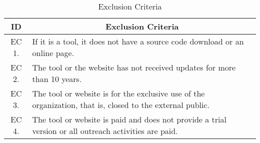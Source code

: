 \begin{table}[!htb]
  \centering
  \caption{Exclusion Criteria}
  \label{tbl:gl-exclusion-criteria}
  \footnotesize
  \begin{tabular}{c|p{12cm}}
    \bottomrule
    \rowcolor[rgb]{0.753,0.753,0.753} \textbf{ID} & \multicolumn{1}{c}{\textbf{Exclusion Criteria}}                                                           \\
    \hline
    \rowcolor[rgb]{0.898,0.898,0.898} EC 1.       & If it is a tool, it does not have a source code download or an online page.                               \\
    EC 2.                                         & The tool or the website has not received updates for more than 10 years.                                  \\
    \rowcolor[rgb]{0.898,0.898,0.898} EC 3.       & The tool or website is for the exclusive use of the organization, that is, closed to the external public. \\
    EC 4.                                         & The tool or website is paid and does not provide a trial version or all outreach activities are paid.     \\
    \toprule
  \end{tabular}
\end{table}